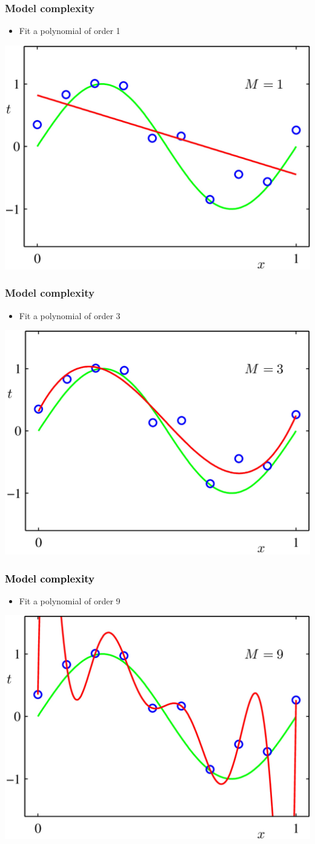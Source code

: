 \documentclass[12pt,notes,mathserif]{beamer}
\begin{document}
\begin{frame}[c]
\frametitle{Model complexity}
\begin{itemize}
\item Fit a polynomial of order 1
\end{itemize}
\begin{center}
\includegraphics[width=0.61\linewidth]{fig/lec54.jpg}
\end{center}
\end{frame}
\begin{frame}[c]
\frametitle{Model complexity}
\begin{itemize}
\item Fit a polynomial of order 3
\end{itemize}
\begin{center}
\includegraphics[width=0.61\linewidth]{fig/lec55.jpg}
\end{center}
\end{frame}
\begin{frame}[c]
\frametitle{\textcolor{black}{Model complexity}}
\begin{itemize}
\item Fit a polynomial of order 9
\end{itemize}
\begin{center}
\includegraphics[width=0.61\linewidth]{fig/lec56.jpg}
\end{center}
\end{frame}
\end{document}
